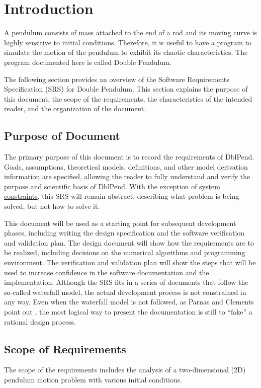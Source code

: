 \documentclass[12pt]{article}
\begin{document}
\section{Introduction}
\label{Sec:Intro}
A pendulum consists of mass attached to the end of a rod and its moving curve is highly sensitive to initial conditions. Therefore, it is useful to have a program to simulate the motion of the pendulum to exhibit its chaotic characteristics. The program documented here is called Double Pendulum.

The following section provides an overview of the Software Requirements Specification (SRS) for Double Pendulum. This section explains the purpose of this document, the scope of the requirements, the characteristics of the intended reader, and the organization of the document.

\subsection{Purpose of Document}
\label{Sec:DocPurpose}
The primary purpose of this document is to record the requirements of DblPend. Goals, assumptions, theoretical models, definitions, and other model derivation information are specified, allowing the reader to fully understand and verify the purpose and scientific basis of DblPend. With the exception of \hyperref[Sec:SysConstraints]{system constraints}, this SRS will remain abstract, describing what problem is being solved, but not how to solve it.

This document will be used as a starting point for subsequent development phases, including writing the design specification and the software verification and validation plan. The design document will show how the requirements are to be realized, including decisions on the numerical algorithms and programming environment. The verification and validation plan will show the steps that will be used to increase confidence in the software documentation and the implementation. Although the SRS fits in a series of documents that follow the so-called waterfall model, the actual development process is not constrained in any way. Even when the waterfall model is not followed, as Parnas and Clements point out \cite{parnasClements1986}, the most logical way to present the documentation is still to ``fake'' a rational design process.

\subsection{Scope of Requirements}
\label{Sec:ReqsScope}
The scope of the requirements includes the analysis of a two-dimensional (2D) pendulum motion problem with various initial conditions.
\end{document}
